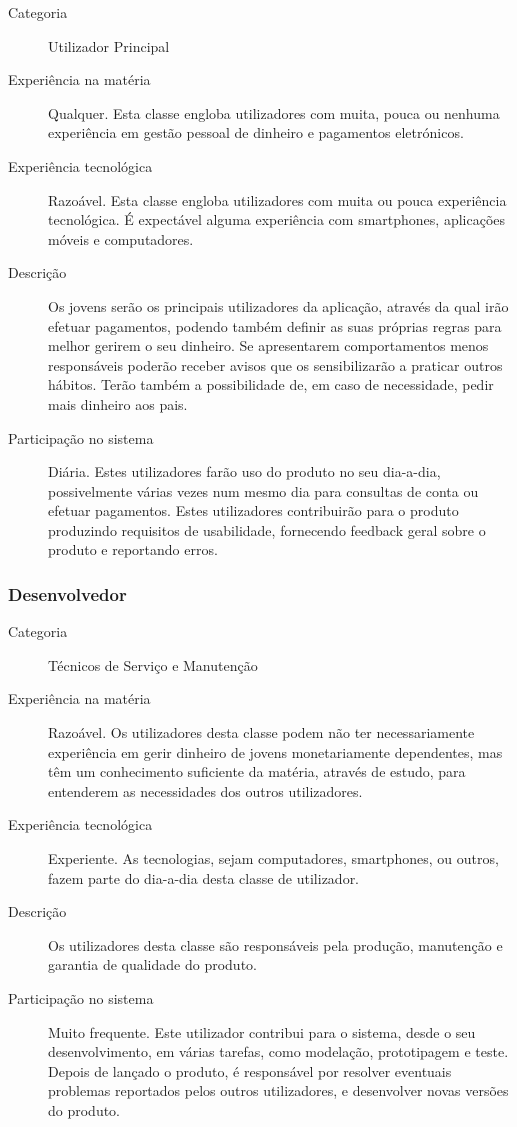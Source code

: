 \documentclass[12pt,a4paper]{article}
\begin{document}
      \begin{description}
        \item[Categoria] Utilizador Principal
        \item[Experiência na matéria] Qualquer. Esta classe engloba utilizadores com muita, pouca ou nenhuma experiência em gestão pessoal de dinheiro e pagamentos eletrónicos.
        \item[Experiência tecnológica] Razoável. Esta classe engloba utilizadores com muita ou pouca experiência tecnológica. É expectável alguma experiência com smartphones, aplicações móveis e computadores.
        \item[Descrição] Os jovens serão os principais utilizadores da aplicação, através da qual irão efetuar pagamentos, podendo também definir as suas próprias regras para melhor gerirem o seu dinheiro. Se apresentarem comportamentos menos responsáveis poderão receber avisos que os sensibilizarão a praticar outros hábitos. Terão também a possibilidade de, em caso de necessidade, pedir mais dinheiro aos pais.
        \item[Participação no sistema] Diária. Estes utilizadores farão uso do produto no seu dia-a-dia, possivelmente várias vezes num mesmo dia para consultas de conta ou efetuar pagamentos. Estes utilizadores contribuirão para o produto produzindo requisitos de usabilidade, fornecendo feedback geral sobre o produto e reportando erros.
      \end{description}

    \subsubsection{Desenvolvedor}

      \begin{description}
        \item[Categoria] Técnicos de Serviço e Manutenção
        \item[Experiência na matéria] Razoável. Os utilizadores desta classe podem não ter necessariamente experiência em gerir dinheiro de jovens monetariamente dependentes, mas têm um conhecimento suficiente da matéria, através de estudo, para entenderem as necessidades dos outros utilizadores.
        \item[Experiência tecnológica] Experiente. As tecnologias, sejam computadores, smartphones, ou outros, fazem parte do dia-a-dia desta classe de utilizador.
        \item[Descrição] Os utilizadores desta classe são responsáveis pela produção, manutenção e garantia de qualidade do produto.
        \item[Participação no sistema] Muito frequente. Este utilizador contribui para o sistema, desde o seu desenvolvimento, em várias tarefas, como modelação, prototipagem e teste. Depois de lançado o produto, é responsável por resolver eventuais problemas reportados pelos outros utilizadores, e desenvolver novas versões do produto.
      \end{description}
\end{document}

